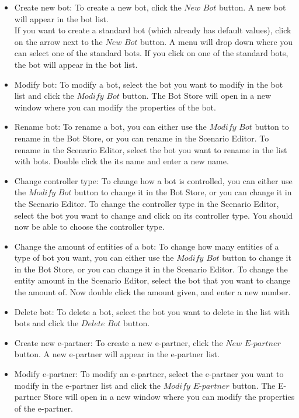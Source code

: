 \begin{itemize}
\item{Create new bot}:
To create a new bot, click the $New$ $Bot$ button. A new bot will appear in the bot list.\\
If you want to create a standard bot (which already has default values), click on the arrow next to the $New$ $Bot$ button. A menu will drop down where you can select one of the standard bots. If you click on one of the standard bots, the bot will appear in the bot list.

\item{Modify bot}:
To modify a bot, select the bot you want to modify in the bot list and click the $Modify$ $Bot$ button. The Bot Store will open in a new window where you can modify the properties of the bot.

\item{Rename bot}:
To rename a bot, you can either use the $Modify$ $Bot$ button to rename in the Bot Store, or you can rename in the Scenario Editor. To rename in the Scenario Editor, select the bot you want to rename in the list with bots. Double click the its name and enter a new name.

\item{Change controller type}:
To change how a bot is controlled, you can either use the $Modify$ $Bot$ button to change it in the Bot Store, or you can change it in the Scenario Editor. To change the controller type in the Scenario Editor, select the bot you want to change and click on its controller type. You should now be able to choose the controller type.

\item{Change the amount of entities of a bot}:
To change how many entities of a type of bot you want, you can either use the $Modify$ $Bot$ button to change it in the Bot Store, or you can change it in the Scenario Editor. To change the entity amount in the Scenario Editor, select the bot that you want to change the amount of. Now double click the amount given, and enter a new number.

\item{Delete bot}:
To delete a bot, select the bot you want to delete in the list with bots and click the $Delete$ $Bot$ button.

\item{Create new e-partner}:
To create a new e-partner, click the $New$ $E$-$partner$ button. A new e-partner will appear in the e-partner list.

\item{Modify e-partner}:
To modify an e-partner, select the e-partner you want to modify in the e-partner list and click the $Modify$ $E$-$partner$ button. The E-partner Store will open in a new window where you can modify the properties of the e-partner.


\end{itemize}
